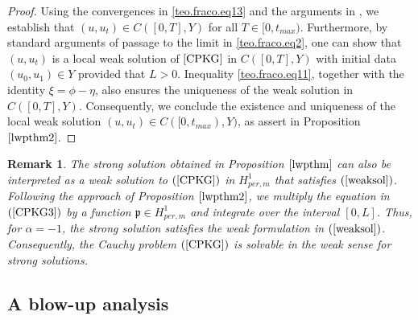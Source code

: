 \documentclass[12pt,reqno,a4paper]{amsart} %
\numberwithin{equation}{section}
\numberwithin{figure}{section}
\newtheorem{remark}[theorem]{Remark}
\begin{document}
\begin{proof}
Using the convergences in \eqref{teo.fraco.eq13} and the arguments in \cite[Lemma 2.4.4]{cazenave}, we establish that $	(u, u_{t})\in  C([0,T],Y)$ for all $T\in [0,t_{max})$. Furthermore, by standard arguments of passage to the limit in \eqref{teo.fraco.eq2}, one can show that $(u, u_t)$ is a local weak solution of $\eqref{CPKG}$ in $C([0,T],Y)$ with initial data $(u_0,u_1)\in Y$ provided that $L>0$. Inequality \eqref{teo.fraco.eq11}, together with the identity $\xi=\phi-\eta$, also ensures the uniqueness of the weak solution in $C([0,T], Y)$.  Consequently, we conclude the existence and uniqueness of the local weak solution $(u, u_t) \in C([0,t_{max}), Y)$, as assert in Proposition $\ref{lwpthm2}$. 
\end{proof}

\begin{remark}\label{remweakstrong} The strong solution obtained in Proposition $\ref{lwpthm}$ can also be interpreted as a weak solution to $(\ref{CPKG})$ in $H_{per,m}^1$ that satisfies $(\ref{weaksol})$. Following the approach of Proposition $\ref{lwpthm2}$, we multiply the equation in $(\ref{CPKG3})$ by a function $\mathfrak{p} \in H_{per,m}^1$ and integrate  over the interval $[0,L]$. Thus, for $\alpha=-1$, the strong solution satisfies the weak formulation in $(\ref{weaksol})$. Consequently, the Cauchy problem $(\ref{CPKG})$ is solvable in the weak sense for strong solutions.
\end{remark}

\subsection{A blow-up analysis}
\end{document}
